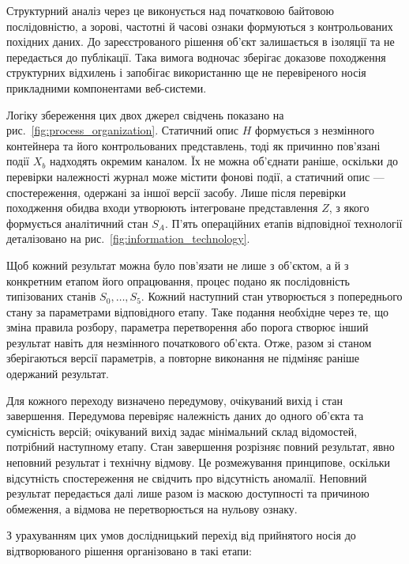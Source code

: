 Структурний аналіз через це виконується над початковою байтовою послідовністю, а зорові, частотні й часові ознаки формуються з контрольованих похідних даних. До зареєстрованого рішення об’єкт залишається в ізоляції та не передається до публікації. Така вимога водночас зберігає доказове походження структурних відхилень і запобігає використанню ще не перевіреного носія прикладними компонентами веб-системи.

Логіку збереження цих двох джерел свідчень показано на рис.~\ref{fig:process_organization}. Статичний опис $H$ формується з незмінного контейнера та його контрольованих представлень, тоді як причинно пов’язані події $X_b$ надходять окремим каналом. Їх не можна об’єднати раніше, оскільки до перевірки належності журнал може містити фонові події, а статичний опис --- спостереження, одержані за іншої версії засобу. Лише після перевірки походження обидва входи утворюють інтегроване представлення $Z$, з якого формується аналітичний стан $S_A$. П’ять операційних етапів відповідної технології деталізовано на рис.~\ref{fig:information_technology}.



Щоб кожний результат можна було пов’язати не лише з об’єктом, а й з конкретним етапом його опрацювання, процес подано як послідовність типізованих станів $S_0,\ldots,S_5$. Кожний наступний стан утворюється з попереднього стану за параметрами відповідного етапу. Таке подання необхідне через те, що зміна правила розбору, параметра перетворення або порога створює інший результат навіть для незмінного початкового об’єкта. Отже, разом зі станом зберігаються версії параметрів, а повторне виконання не підміняє раніше одержаний результат.

Для кожного переходу визначено передумову, очікуваний вихід і стан завершення. Передумова перевіряє належність даних до одного об’єкта та сумісність версій; очікуваний вихід задає мінімальний склад відомостей, потрібний наступному етапу. Стан завершення розрізняє повний результат, явно неповний результат і технічну відмову. Це розмежування принципове, оскільки відсутність спостереження не свідчить про відсутність аномалії. Неповний результат передається далі лише разом із маскою доступності та причиною обмеження, а відмова не перетворюється на нульову ознаку.

З урахуванням цих умов дослідницький перехід від прийнятого носія до відтворюваного рішення організовано в такі етапи:


